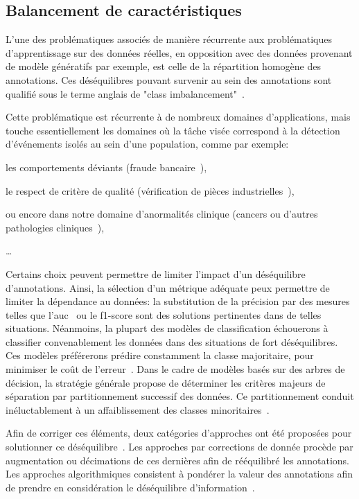 \subsection{Balancement de caractéristiques}
L'une des problématiques associés de manière récurrente aux problématiques d'apprentissage sur des données réelles, en opposition avec des données provenant de modèle génératifs par exemple, est celle de la répartition homogène des annotations. Ces déséquilibres pouvant survenir au sein des annotations sont qualifié sous le terme anglais de "class imbalancement"~\cite{Prati2009, He2009}.\par

Cette problématique est récurrente à de nombreux domaines d'applications, mais touche essentiellement les domaines où la tâche visée correspond à la détection d'événements isolés au sein d'une population, comme par exemple: 
\begin{inlinerate}
    \item les comportements déviants (fraude bancaire~\cite{Phua2004}),
    \item le respect de critère de qualité (vérification de pièces industrielles~\cite{Wu2018}),
    \item ou encore dans notre domaine d'anormalités clinique (cancers ou d'autres pathologies cliniques~\cite{Celebi2007}),
    \item \ldots
\end{inlinerate}\par

Certains choix peuvent permettre de limiter l'impact d'un déséquilibre d'annotations. Ainsi, la sélection d'un métrique adéquate peux permettre de limiter la dépendance au données: la substitution de la précision par des mesures telles que l'\gls{auc}~\cite{Celebi2007} ou le f1-score sont des solutions pertinentes dans de telles situations. Néanmoins, la plupart des modèles de classification échouerons à classifier convenablement les données dans des situations de fort déséquilibres. Ces modèles préférerons prédire constamment la classe majoritaire, pour minimiser le coût de l'erreur~\cite{Huang2013}. Dans le cadre de modèles basés sur des arbres de décision, la stratégie générale propose de déterminer les critères majeurs de séparation par partitionnement successif des données. Ce partitionnement conduit inéluctablement à un affaiblissement des classes minoritaires~\cite{He2009}.\par 

Afin de corriger ces éléments, deux catégories d'approches ont été proposées pour solutionner ce déséquilibre~\cite{Huang2013}. Les approches par corrections de donnée procède par augmentation ou décimations de ces dernières afin de rééquilibré les annotations. Les approches algorithmiques consistent à pondérer la valeur des annotations afin de prendre en considération le déséquilibre d'information~\cite{Ting2002,He2009,Thai2010}.\par

